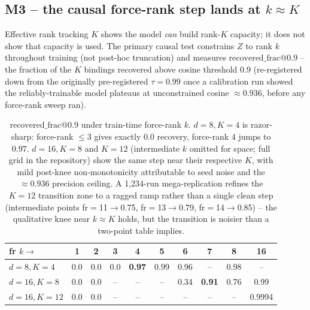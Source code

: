 \subsection{M3 -- the causal force-rank step lands at $k\approx K$}
\label{sec:taskd-m3}

Effective rank tracking $K$ shows the model \emph{can} build rank-$K$
capacity; it does not show that capacity is used. The primary causal test
constrains $Z$ to rank $k$ throughout training (not post-hoc truncation)
and measures $\mathrm{recovered\_frac@0.9}$ -- the fraction of the $K$
bindings recovered above cosine threshold $0.9$ (re-registered down from
the originally pre-registered $\tau{=}0.99$ once a calibration run showed
the reliably-trainable model plateaus at unconstrained cosine $\approx
0.936$, before any force-rank sweep ran).

\begin{table}[t]
\centering
\scriptsize
\setlength{\tabcolsep}{2.3pt}
\begin{tabular}{lccccccccc}
\toprule
fr $k\to$ & 1 & 2 & 3 & 4 & 5 & 6 & 7 & 8 & 16 \\
\midrule
$d{=}8,K{=}4$   & 0.0 & 0.0 & 0.0 & \textbf{0.97} & 0.99 & 0.96 & -- & 0.98 & -- \\
$d{=}16,K{=}8$  & 0.0 & 0.0 & -- & -- & -- & 0.34 & \textbf{0.91} & 0.76 & 0.99 \\
$d{=}16,K{=}12$ & 0.0 & 0.0 & -- & -- & -- & -- & -- & -- & 0.9994 \\
\bottomrule
\end{tabular}
\caption{$\mathrm{recovered\_frac@0.9}$ under train-time force-rank $k$.
$d{=}8,K{=}4$ is razor-sharp: force-rank $\leq 3$ gives exactly $0.0$
recovery, force-rank $4$ jumps to $0.97$. $d{=}16,K{=}8$ and $K{=}12$
(intermediate $k$ omitted for space; full grid in the repository) show the
same step near their respective $K$, with mild post-knee
non-monotonicity attributable to seed noise and the $\approx0.936$
precision ceiling. A 1{,}234-run mega-replication refines the $K{=}12$
transition zone to a ragged ramp rather than a single clean step
(intermediate points fr$=$11$\to$0.75, fr$=$13$\to$0.79, fr$=$14$\to$0.85)
-- the qualitative knee near $k\approx K$ holds, but the transition is
noisier than a two-point table implies.}
\label{tab:taskd-m3}
\end{table}

